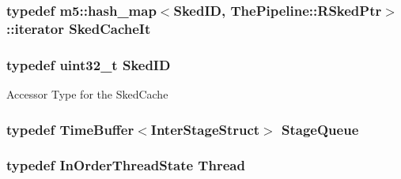 \label{classInOrderCPU_a36d25e03e43fa3bb4c5482cbefe5e0fb}
\hypertarget{classInOrderCPU_ade41d453959a2fd39fc8e5ddeea16e0e}{
\subsubsection[{SkedCacheIt}]{\setlength{\rightskip}{0pt plus 5cm}typedef m5::hash\_\-map$<${\bf SkedID}, {\bf ThePipeline::RSkedPtr}$>$::iterator {\bf SkedCacheIt}}}
\label{classInOrderCPU_ade41d453959a2fd39fc8e5ddeea16e0e}
\hypertarget{classInOrderCPU_a630137ef811336d3ee312e01adb43991}{
\subsubsection[{SkedID}]{\setlength{\rightskip}{0pt plus 5cm}typedef {\bf uint32\_\-t} {\bf SkedID}}}
\label{classInOrderCPU_a630137ef811336d3ee312e01adb43991}
Accessor Type for the SkedCache \hypertarget{classInOrderCPU_a2dd1ce49bce6a9a8c83156a21ca638a0}{
\subsubsection[{StageQueue}]{\setlength{\rightskip}{0pt plus 5cm}typedef {\bf TimeBuffer}$<${\bf InterStageStruct}$>$ {\bf StageQueue}}}
\label{classInOrderCPU_a2dd1ce49bce6a9a8c83156a21ca638a0}
\hypertarget{classInOrderCPU_a71082c68d1af09b939b47c729ab022e2}{
\subsubsection[{Thread}]{\setlength{\rightskip}{0pt plus 5cm}typedef {\bf InOrderThreadState} {\bf Thread}}}
\label{classInOrderCPU_a71082c68d1af09b939b47c729ab022e2}


